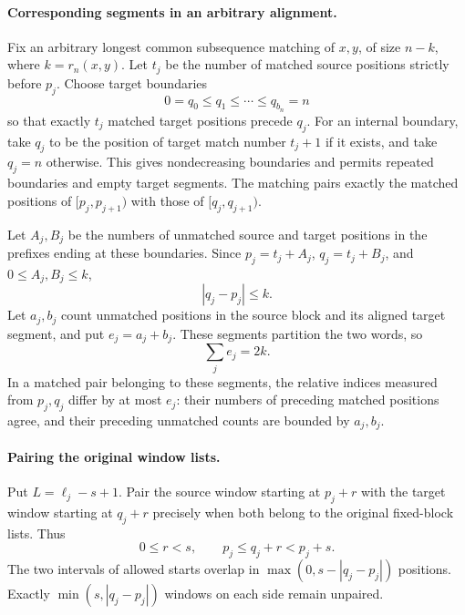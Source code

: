 \paragraph{Corresponding segments in an arbitrary alignment.}
Fix an arbitrary longest common subsequence matching of $x,y$, of
size $n-k$, where $k=r_n(x,y)$.  Let $t_j$ be the number of matched
source positions strictly before $p_j$.  Choose target boundaries
\[
 0=q_0\le q_1\le\cdots\le q_{b_n}=n
\]
so that exactly $t_j$ matched target positions precede $q_j$.
For an internal boundary, take $q_j$ to be the position of target
match number $t_j+1$ if it exists, and take $q_j=n$ otherwise.
This gives nondecreasing boundaries and permits repeated boundaries
and empty target segments.  The matching pairs exactly the matched
positions of $[p_j,p_{j+1})$ with those of $[q_j,q_{j+1})$.

Let $A_j,B_j$ be the numbers of unmatched source and target positions
in the prefixes ending at these boundaries.  Since
$p_j=t_j+A_j$, $q_j=t_j+B_j$, and $0\le A_j,B_j\le k$,
\begin{equation}\label{upper:boundary-shift}
 |q_j-p_j|\le k.
\end{equation}
Let $a_j,b_j$ count unmatched positions in the source block and its
aligned target segment, and put $e_j=a_j+b_j$.  These segments
partition the two words, so
\begin{equation}\label{upper:unmatched-total}
 \sum_j e_j=2k.
\end{equation}
In a matched pair belonging to these segments, the relative indices
measured from $p_j,q_j$ differ by at most $e_j$: their numbers of
preceding matched positions agree, and their preceding unmatched
counts are bounded by $a_j,b_j$.

\paragraph{Pairing the original window lists.}
Put $L=\ell_j-s+1$.  Pair the source window starting at $p_j+r$
with the target window starting at $q_j+r$ precisely when both belong
to the original fixed-block lists.  Thus
\[
 0\le r<s,\qquad p_j\le q_j+r<p_j+s.
\]
The two intervals of allowed starts overlap in
$\max(0,s-|q_j-p_j|)$ positions.  Exactly
$\min(s,|q_j-p_j|)$ windows on each side remain unpaired.


